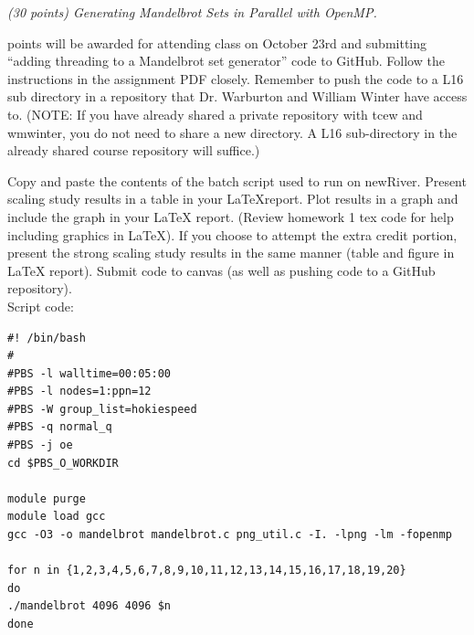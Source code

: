 \documentclass{article}
\newcommand{\pad}{\vspace{8pt}\noindent}
\begin{document}
\pad {\bf Q2} {\it (30 points) Generating Mandelbrot Sets in Parallel with OpenMP.}
\vspace{8pt} 

 points will be awarded for attending class on October 23rd and submitting ``adding threading to a Mandelbrot set generator'' code to GitHub. Follow the instructions in the assignment PDF closely. Remember to push the code to a L16 sub directory in a repository that Dr. Warburton and William Winter have access to. (NOTE: If you have already shared a private repository with tcew and wmwinter, you do not need to share a new directory. A L16 sub-directory in the already shared course repository will suffice.) 

\vspace{1em}

\noindent Copy and paste the contents of the batch script used to run on newRiver. Present scaling study results in a table in your \LaTeX report. Plot results in a graph and include the graph in your \LaTeX{} report. (Review homework 1 tex code for help including graphics in \LaTeX). If you choose to attempt the extra credit portion, present the strong scaling study results in the same manner (table and figure in \LaTeX{} report). Submit code to canvas (as well as pushing code to a GitHub repository). \\

Script code:

\begin{verbatim}
#! /bin/bash                                                                    
#                                                                               
#PBS -l walltime=00:05:00                                                       
#PBS -l nodes=1:ppn=12                                                          
#PBS -W group_list=hokiespeed                                                   
#PBS -q normal_q                                                                
#PBS -j oe                                                                      
cd $PBS_O_WORKDIR

module purge
module load gcc
gcc -O3 -o mandelbrot mandelbrot.c png_util.c -I. -lpng -lm -fopenmp

for n in {1,2,3,4,5,6,7,8,9,10,11,12,13,14,15,16,17,18,19,20}
do
./mandelbrot 4096 4096 $n
done
\end{verbatim}
\end{document}
